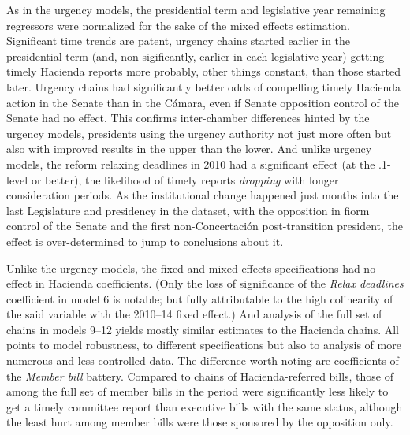 \documentclass[letter,12pt]{article}
\begin{document}
As in the urgency models, the presidential term and legislative year remaining regressors were normalized for the sake of the mixed effects estimation. Significant time trends are patent, urgency chains started earlier in the presidential term (and, non-sigificantly, earlier in each legislative year) getting timely Hacienda reports more probably, other things constant, than those started later. Urgency chains had significantly better odds of compelling timely Hacienda action in the Senate than in the C\'amara, even if Senate opposition control of the Senate had no effect. This confirms inter-chamber differences hinted by the urgency models, presidents using the urgency authority not just more often but also with improved results in the upper than the lower. And unlike urgency models, the reform relaxing deadlines in 2010 had a significant effect (at the .1-level or better), the likelihood of timely reports \emph{dropping} with longer consideration periods. As the institutional change happened just months into the last Legislature and presidency in the dataset, with the opposition in fiorm control of the Senate and the first non-Concertaci\'on post-transition president, the effect is over-determined to jump to conclusions about it. 

Unlike the urgency models, the fixed and mixed effects specifications had no effect in Hacienda coefficients. (Only the loss of significance of the \emph{Relax deadlines} coefficient in model 6 is notable; but fully attributable to the high colinearity of the said variable with the 2010--14 fixed effect.) And analysis of the full set of chains in models 9--12 yields mostly similar estimates to the Hacienda chains. All points to model robustness, to different specifications but also to analysis of more numerous and less controlled data. The difference worth noting are coefficients of the \emph{Member bill} battery. Compared to chains of Hacienda-referred bills, those of among the full set of member bills in the period were significantly less likely to get a timely committee report than executive bills with the same status, although the least hurt among member bills were those sponsored by the opposition only. 
\end{document}
